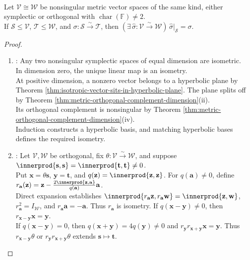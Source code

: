 \begin{theorem} \label{thm:witt-extension-theorem-metric-spaces} \\
Let $\mathcal{V}\cong\mathcal{W}$ be nonsingular metric vector spaces of the same kind, either symplectic or orthogonal with $\operatorname{char}(\mathbb{F})\neq2$.\\
If $\mathcal{S}\leq\mathcal{V}$, $\mathcal{T}\leq\mathcal{W}$, and $\sigma:\mathcal{S}\xrightarrow{\sim}\mathcal{T}$, then $(\exists\,\widehat{\sigma}:\mathcal{V}\xrightarrow{\sim}\mathcal{W})\,\widehat{\sigma}|_{\mathcal{S}}=\sigma$.
\begin{proof}
\begin{enumerate}[label=(\roman*)]
\setlength{\itemsep}{0pt}
\item {}: Any two nonsingular symplectic spaces of equal dimension are isometric.\\
In dimension zero, the unique linear map is an isometry.\\
At positive dimension, a nonzero vector belongs to a hyperbolic plane by Theorem \ref{thm:isotropic-vector-sits-in-hyperbolic-plane}. The plane splits off by Theorem \ref{thm:metric-orthogonal-complement-dimension}(ii).\\
Its orthogonal complement is nonsingular by Theorem \ref{thm:metric-orthogonal-complement-dimension}(iv).\\
Induction constructs a hyperbolic basis, and matching hyperbolic bases defines the required isometry.
\item {}: Let $\mathcal{V},\mathcal{W}$ be orthogonal, fix $\theta:\mathcal{V}\xrightarrow{\sim}\mathcal{W}$, and suppose $\innerprod{\mathbf{s},\mathbf{s}}=\innerprod{\mathbf{t},\mathbf{t}}\neq0$.\\
Put $\mathbf{x}=\theta\mathbf{s}$, $\mathbf{y}=\mathbf{t}$, and $q(\mathbf{z})=\innerprod{\mathbf{z},\mathbf{z}}$. For $q(\mathbf{a})\neq0$, define $r_{\mathbf{a}}(\mathbf{z})=\mathbf{z}-\frac{2\innerprod{\mathbf{z},\mathbf{a}}}{q(\mathbf{a})}\mathbf{a}$.\\
Direct expansion establishes $\innerprod{r_{\mathbf{a}}\mathbf{z},r_{\mathbf{a}}\mathbf{w}}=\innerprod{\mathbf{z},\mathbf{w}}$, $r_{\mathbf{a}}^2=I_{\mathcal{W}}$, and $r_{\mathbf{a}}\mathbf{a}=-\mathbf{a}$. Thus $r_{\mathbf{a}}$ is isometry. If $q(\mathbf{x}-\mathbf{y})\neq0$, then $r_{\mathbf{x}-\mathbf{y}}\mathbf{x}=\mathbf{y}$.\\
If $q(\mathbf{x}-\mathbf{y})=0$, then $q(\mathbf{x}+\mathbf{y})=4q(\mathbf{y})\neq0$ and $r_{\mathbf{y}}r_{\mathbf{x}+\mathbf{y}}\mathbf{x}=\mathbf{y}$. Thus $r_{\mathbf{x}-\mathbf{y}}\theta$ or $r_{\mathbf{y}}r_{\mathbf{x}+\mathbf{y}}\theta$ extends $\mathbf{s}\mapsto\mathbf{t}$.

\end{enumerate}
\end{proof}
\end{theorem}
